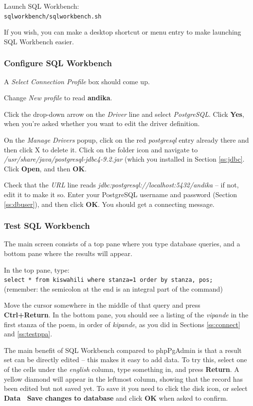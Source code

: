 Launch SQL Workbench:\\
\verb|sqlworkbench/sqlworkbench.sh|

If you wish, you can make a desktop shortcut or menu entry to make launching SQL Workbench easier.

\subsubsection{Configure SQL Workbench}

A \textit{Select Connection Profile} box should come up. 

Change \textit{New profile} to read \textbf{andika}.

Click the drop-down arrow on the \textit{Driver} line and select \textit{PostgreSQL}. Click \textbf{Yes}, when you're asked whether you want to edit the driver definition.

On the \textit{Manage Drivers} popup, click on the red \textit{postgresql} entry already there and then click X to delete it.  Click on the folder icon and navigate to \textit{/usr/share/java/postgresql-jdbc4-9.2.jar} (which you installed in Section \ref{ss:jdbc}.  Click \textbf{Open}, and then \textbf{OK}.

Check that the \textit{URL} line reads \textit{jdbc:postgresql://localhost:5432/andika} -- if not, edit it to make it so. Enter your PostgreSQL username and password (Section \ref{ss:dbuser}), and then click \textbf{OK}.  You should get a connecting message.

\subsubsection{Test SQL Workbench}

The main screen consists of a top pane where you type database queries, and a bottom pane where the results will appear. 

In the top pane, type:\\
\verb|select * from kiswahili where stanza=1 order by stanza, pos;|\\
(remember: the semicolon at the end is an integral part of the command)

Move the cursor somewhere in the middle of that query and press \textbf{Ctrl+Return}.  In the bottom pane, you should see a listing of the \textit{vipande} in the first stanza of the poem, in order of \textit{kipande}, as you did in Sections \ref{ss:connect} and \ref{ss:testppa}.

The main benefit of SQL Workbench compared to phpPgAdmin is that a result set can be directly edited -- this makes it easy to add data.  To try this, select one of the cells under the \textit{english} column, type something in, and press \textbf{Return}.  A yellow diamond will appear in the leftmost column, showing that the record has been edited but not saved yet. To save it you need to click the disk icon, or select \textbf{Data \textrightarrow\ Save changes to database} and click \textbf{OK} when asked to confirm.

